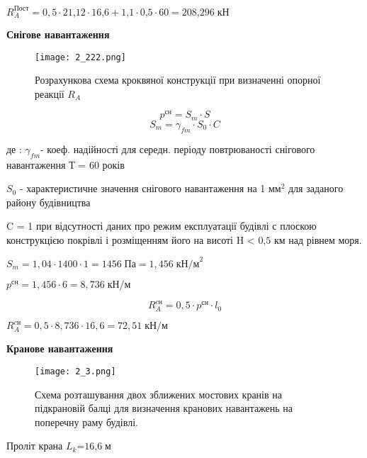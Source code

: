 \documentclass[a4paper,14pt]{article}
\begin{document}
$R^{\textit{Пост}}_A=0,5\cdot {\textit{21,12}}\cdot {\textit{16,6}}+ {\textit{1,1}}\cdot {\textit{0,5}}\cdot 60={\textit{208,296}}\;{\textit{кН}}$

\textbf{Снігове навантаження}
\begin{figure}[h!]
    \begin{center}
        \texttt{[image: 2\_222.png]}
        \caption{Розрахункова схема кроквяної конструкції при визначенні
        опорної реакції $R_A$}\label{ris2_222} 
    \end{center}
\end{figure}
\begin{equation}
    p^{\textit{сн}}=S_{\textit{m}}\cdot S
\end{equation}
\begin{equation}
    S_m=\gamma_{fm}\cdot S_0 \cdot C
\end{equation}

де : $\gamma_{fm}$- коеф. надійності для середн. періоду повтрюваності снігового навантаження Т = 60 років 

$S_0$ - характеристичне значення снігового навантаження на 1 м$м^{\textit{2}}$ для заданого району будівництва

C = 1 при відсутності даних про режим експлуатації будівлі с плоскою конструкцією покрівлі і розміщенням його на висоті H < ${\textit{0,5}}$ км над рівнем моря.

$S_m=1,04\cdot 1400\cdot 1=1456\;\textit{Па}=1,456\;{\textit{кН/м}}^2$

$p^{\textit{сн}}=1,456\cdot 6=8,736\;\textit{кН/м}$

\begin{equation}
    R^{\textit{cн}}_A=0,5\cdot p^{\textit{сн}}\cdot l_0
\end{equation}

$R^{\textit{cн}}_A=0,5\cdot 8,736 \cdot 16,6 = 72,51\;\textit{кН/м}$

\textbf{Кранове навантаження}
\begin{figure}[h]
    \begin{center}
        \texttt{[image: 2\_3.png]}
        \caption{Схема розташування двох зближених мостових кранів на
        підкрановій балці для визначення кранових навантажень на поперечну раму
        будівлі.}\label{ris2_3} 
    \end{center}
\end{figure}

Проліт крана $L_k$=$\textit{16,6}\;\textit{м}$
\end{document}
